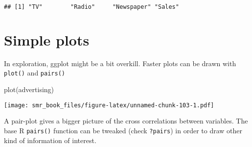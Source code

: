 \documentclass[
  oneside]{book}
\newenvironment{Shaded}{\begin{snugshade}}{\end{snugshade}}
\newcommand{\FunctionTok}[1]{\textcolor[rgb]{0.00,0.00,0.00}{#1}}
\newcommand{\NormalTok}[1]{#1}
\begin{document}
\begin{verbatim}
## [1] "TV"        "Radio"     "Newspaper" "Sales"
\end{verbatim}

\hypertarget{simple-plots}{%
\section{Simple plots}\label{simple-plots}}

In exploration, ggplot might be a bit overkill. Faster
plots can be drawn with \texttt{plot()} and \texttt{pairs()}

\begin{Shaded}
\begin{Highlighting}[]
\FunctionTok{plot}\NormalTok{(advertising)}
\end{Highlighting}
\end{Shaded}

\texttt{[image: smr\_book\_files/figure-latex/unnamed-chunk-103-1.pdf]}

A pair-plot gives a bigger picture of the
cross correlations between variables.
The base R \texttt{pairs()} function can be tweaked (check \texttt{?pairs})
in order to draw other kind of information of interest.
\end{document}
